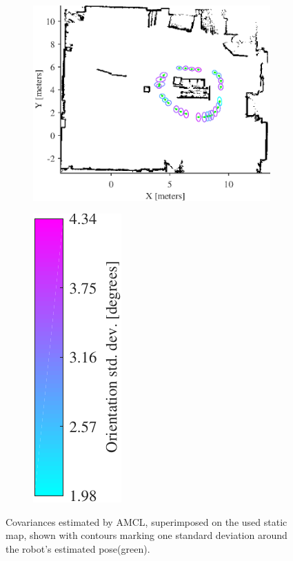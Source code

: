 \begin{figure}[htbp]
    \begin{subfigure}[t]{0.7\textwidth}	
        \centering	
        \includegraphics[scale=1.0]{chapters/evaluation/figures/flexlab_path_with_covariance_with_cleaned_map}
    \end{subfigure}
    \begin{subfigure}[t]{0.2\textwidth}
        \centering
        \includegraphics[scale=1.0]{chapters/evaluation/figures/flexlab_path_with_covariance_bar-crop}
    \end{subfigure}
    \caption{Covariances estimated by AMCL, superimposed on the used static map, shown with contours marking one standard deviation around the robot's estimated pose(green).}
    \label{fig:flexlab_path_with_covariance_with_cleaned_map}
\end{figure}


